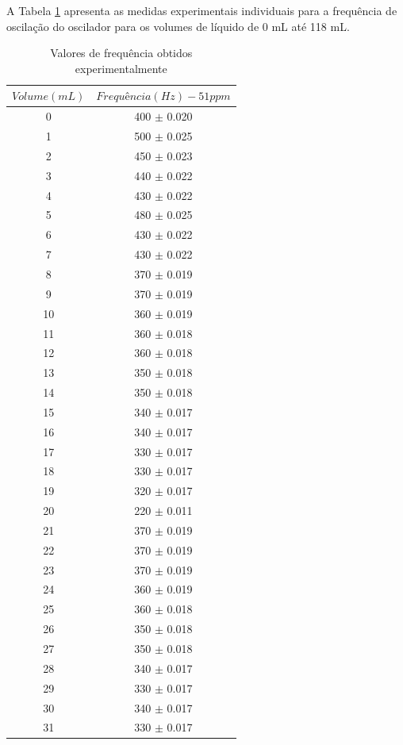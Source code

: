 \documentclass[a4paper]{instrumentacao}
\begin{document}
A Tabela \ref{tab:resultados-pluviometro-frequencia} apresenta as medidas experimentais individuais para a frequência de oscilação do oscilador para os volumes de líquido de 0 mL até 118 mL.

\begin{longtable}{cc}
\caption{Valores de frequência obtidos experimentalmente} \label{tab:resultados-pluviometro-frequencia} \\
\textbf{$Volume (mL)$} & \textbf{$Frequência (Hz) - 51ppm$} \\ \hline
 0 & 400 $\pm$ 0.020 \\
 1 & 500 $\pm$ 0.025 \\
 2 & 450 $\pm$ 0.023 \\
 3 & 440 $\pm$ 0.022 \\
 4 & 430 $\pm$ 0.022 \\
 5 & 480 $\pm$ 0.025 \\
 6 & 430 $\pm$ 0.022 \\
 7 & 430 $\pm$ 0.022 \\
 8 & 370 $\pm$ 0.019 \\
 9 & 370 $\pm$ 0.019 \\
 10 & 360 $\pm$ 0.019 \\
 11 & 360 $\pm$ 0.018 \\
 12 & 360 $\pm$ 0.018 \\
 13 & 350 $\pm$ 0.018 \\
 14 & 350 $\pm$ 0.018 \\
 15 & 340 $\pm$ 0.017 \\
 16 & 340 $\pm$ 0.017 \\
 17 & 330 $\pm$ 0.017 \\
 18 & 330 $\pm$ 0.017 \\
 19 & 320 $\pm$ 0.017 \\
 20 & 220 $\pm$ 0.011 \\
 21 & 370 $\pm$ 0.019 \\
 22 & 370 $\pm$ 0.019 \\
 23 & 370 $\pm$ 0.019 \\
 24 & 360 $\pm$ 0.019 \\
 25 & 360 $\pm$ 0.018 \\
 26 & 350 $\pm$ 0.018 \\
 27 & 350 $\pm$ 0.018 \\
 28 & 340 $\pm$ 0.017 \\
 29 & 330 $\pm$ 0.017 \\
 30 & 340 $\pm$ 0.017 \\
 31 & 330 $\pm$ 0.017 \\

\end{longtable}
\end{document}
